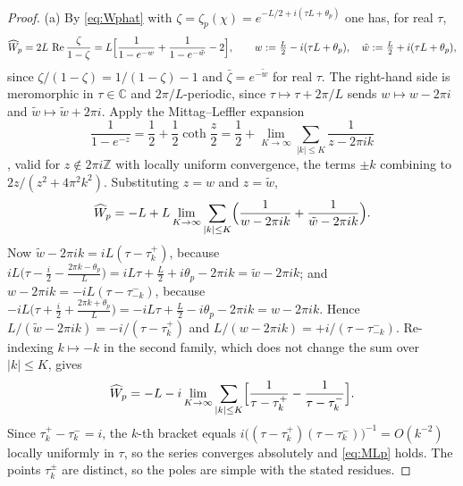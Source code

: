 \documentclass[11pt]{amsart}
\theoremstyle{definition}
\theoremstyle{remark}
\newcommand{\C}{\mathbb C}
\newcommand{\Z}{\mathbb Z}
\newcommand{\Rel}{\operatorname{Re}}
\newcommand{\Wh}{\widehat{W}}
\begin{document}
\begin{proof}
(a)  By \eqref{eq:Wphat} with
$\zeta=\zeta_p(\chi)=e^{-L/2+i(\tau L+\theta_p)}$ one has, for real $\tau$,
\begin{equation}\label{eq:twoexp}
\Wh_p=2L\,\Rel\frac{\zeta}{1-\zeta}
=L\Bigl[\frac{1}{1-e^{-w}}+\frac{1}{1-e^{-\tilde w}}-2\Bigr],\qquad
w:=\tfrac L2-i(\tau L+\theta_p),\quad \tilde w:=\tfrac L2+i(\tau L+\theta_p),
\end{equation}
since $\zeta/(1-\zeta)=1/(1-\zeta)-1$ and $\bar\zeta=e^{-\tilde w}$ for real
$\tau$.  The right-hand side is meromorphic in $\tau\in\C$ and
$2\pi/L$-periodic, since $\tau\mapsto\tau+2\pi/L$ sends $w\mapsto w-2\pi i$ and
$\tilde w\mapsto\tilde w+2\pi i$.  Apply the Mittag--Leffler expansion
\begin{equation}\label{eq:coth}
\frac{1}{1-e^{-z}}=\frac12+\frac12\coth\frac z2
=\frac12+\lim_{K\to\infty}\sum_{|k|\le K}\frac{1}{z-2\pi ik}
\end{equation}
\cite[(4.36.3)]{DLMF}, valid for $z\notin2\pi i\Z$ with locally uniform
convergence, the terms $\pm k$ combining to $2z/(z^{2}+4\pi^{2}k^{2})$.
Substituting $z=w$ and $z=\tilde w$,
\[
\Wh_p=-L+L\lim_{K\to\infty}\sum_{|k|\le K}\Bigl(\frac1{w-2\pi ik}
+\frac1{\tilde w-2\pi ik}\Bigr).
\]
Now $\tilde w-2\pi ik=iL(\tau-\tau_k^{+})$, because
$iL\bigl(\tau-\tfrac i2-\tfrac{2\pi k-\theta_p}{L}\bigr)
=iL\tau+\tfrac L2+i\theta_p-2\pi ik=\tilde w-2\pi ik$; and
$w-2\pi ik=-iL(\tau-\tau_{-k}^{-})$, because
$-iL\bigl(\tau+\tfrac i2+\tfrac{2\pi k+\theta_p}{L}\bigr)
=-iL\tau+\tfrac L2-i\theta_p-2\pi ik=w-2\pi ik$.  Hence
$L/(\tilde w-2\pi ik)=-i/(\tau-\tau_k^{+})$ and
$L/(w-2\pi ik)=+i/(\tau-\tau_{-k}^{-})$.  Re-indexing $k\mapsto-k$ in the
second family, which does not change the sum over $|k|\le K$, gives
\[
\Wh_p=-L-i\lim_{K\to\infty}\sum_{|k|\le K}
\Bigl[\frac{1}{\tau-\tau_k^{+}}-\frac{1}{\tau-\tau_k^{-}}\Bigr].
\]
Since $\tau_k^{+}-\tau_k^{-}=i$, the $k$-th bracket equals
$i\bigl((\tau-\tau_k^{+})(\tau-\tau_k^{-})\bigr)^{-1}=O(k^{-2})$ locally
uniformly in $\tau$, so the series converges absolutely and \eqref{eq:MLp}
holds.  The points $\tau_k^{\pm}$ are distinct, so the poles are simple with
the stated residues.


\end{proof}
\end{document}
